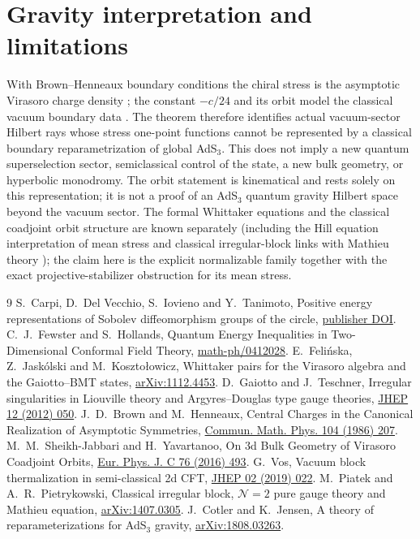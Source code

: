 \documentclass[11pt]{article}
\begin{document}
\section{Gravity interpretation and limitations}
With Brown--Henneaux boundary conditions the chiral stress is the asymptotic Virasoro charge density \cite{bh,cotler}; the constant $-c/24$ and its orbit model the classical vacuum boundary data \cite{orbit}. The theorem therefore identifies actual vacuum-sector Hilbert rays whose stress one-point functions cannot be represented by a classical boundary reparametrization of global AdS$_3$. This does not imply a new quantum superselection sector, semiclassical control of the state, a new bulk geometry, or hyperbolic monodromy. The orbit statement is kinematical and rests solely on this representation; it is not a proof of an AdS$_3$ quantum gravity Hilbert space beyond the vacuum sector. The formal Whittaker equations and the classical coadjoint orbit structure are known separately (including the Hill equation interpretation of mean stress \cite{vos} and classical irregular-block links with Mathieu theory \cite{piatek}); the claim here is the explicit normalizable family together with the exact projective-stabilizer obstruction for its mean stress.

\begin{thebibliography}{9}
 S.~Carpi, D.~Del Vecchio, S.~Iovieno and Y.~Tanimoto,
Positive energy representations of Sobolev diffeomorphism groups of the circle,
\href{https://doi.org/10.1007/s13324-020-00429-5}{publisher DOI}.
 C.~J.~Fewster and S.~Hollands,
Quantum Energy Inequalities in Two-Dimensional Conformal Field Theory,
\href{https://arxiv.org/abs/math-ph/0412028}{math-ph/0412028}.
 E.~Feli\'nska, Z.~Jask\'olski and M.~Koszto\l owicz,
Whittaker pairs for the Virasoro algebra and the Gaiotto--BMT states,
\href{https://arxiv.org/abs/1112.4453}{arXiv:1112.4453}.
 D.~Gaiotto and J.~Teschner,
Irregular singularities in Liouville theory and Argyres--Douglas type gauge theories,
\href{https://doi.org/10.1007/JHEP12(2012)050}{JHEP 12 (2012) 050}.
 J.~D.~Brown and M.~Henneaux,
Central Charges in the Canonical Realization of Asymptotic Symmetries,
\href{https://doi.org/10.1007/BF01211590}{Commun. Math. Phys. 104 (1986) 207}.
 M.~M.~Sheikh-Jabbari and H.~Yavartanoo,
On 3d Bulk Geometry of Virasoro Coadjoint Orbits,
\href{https://doi.org/10.1140/epjc/s10052-016-4326-z}{Eur. Phys. J. C 76 (2016) 493}.
 G.~Vos,
Vacuum block thermalization in semi-classical 2d CFT,
\href{https://doi.org/10.1007/JHEP02(2019)022}{JHEP 02 (2019) 022}.
 M.~Piatek and A.~R.~Pietrykowski,
Classical irregular block, $\mathcal N=2$ pure gauge theory and Mathieu equation,
\href{https://arxiv.org/abs/1407.0305}{arXiv:1407.0305}.
 J.~Cotler and K.~Jensen,
A theory of reparameterizations for AdS$_3$ gravity,
\href{https://arxiv.org/abs/1808.03263}{arXiv:1808.03263}.
\end{thebibliography}
\end{document}

